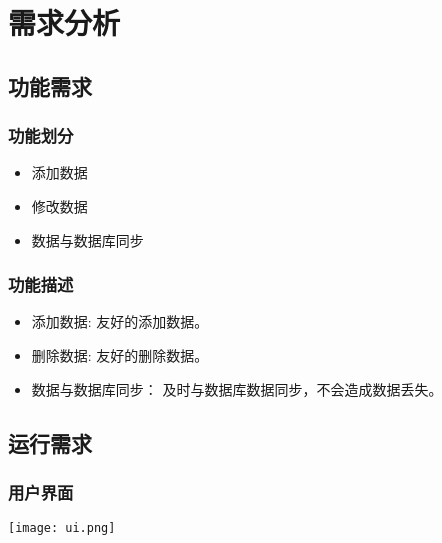 \chapter{需求分析}
\section{功能需求}
	\subsection{功能划分}
		\begin{itemize}
			\item 添加数据
			\item 修改数据
			\item 数据与数据库同步
		\end{itemize}
	\subsection{功能描述}
		\begin{itemize}
			\item 添加数据: 友好的添加数据。
			\item 删除数据: 友好的删除数据。
			\item 数据与数据库同步： 及时与数据库数据同步，不会造成数据丢失。
		\end{itemize}
\section{运行需求}
	\subsection{用户界面}
		\texttt{[image: ui.png]}
